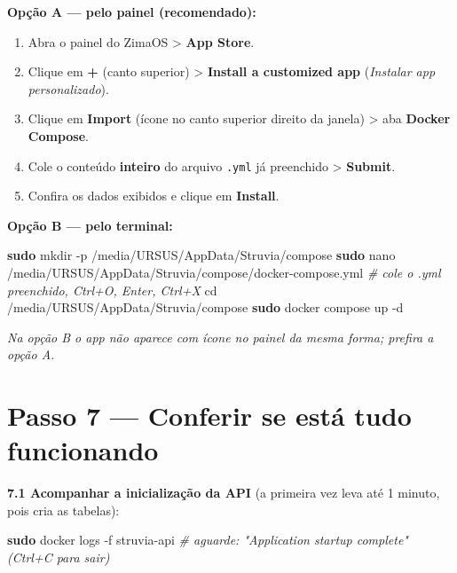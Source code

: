 \documentclass[
  10pt,
]{article}
\newenvironment{Shaded}{\begin{snugshade}}{\end{snugshade}}
\newcommand{\AttributeTok}[1]{\textcolor[rgb]{0.13,0.29,0.53}{#1}}
\newcommand{\BuiltInTok}[1]{#1}
\newcommand{\CommentTok}[1]{\textcolor[rgb]{0.56,0.35,0.01}{\textit{#1}}}
\newcommand{\FunctionTok}[1]{\textcolor[rgb]{0.13,0.29,0.53}{\textbf{#1}}}
\newcommand{\NormalTok}[1]{#1}
\providecommand{\tightlist}{%
  \setlength{\itemsep}{0pt}\setlength{\parskip}{0pt}}
\renewenvironment{quote}{\begin{oldquote}\small\itshape}{\end{oldquote}}
\begin{document}
\textbf{Opção A --- pelo painel (recomendado):}

\begin{enumerate}
\def\labelenumi{\arabic{enumi}.}
\tightlist
\item
  Abra o painel do ZimaOS \textgreater{} \textbf{App Store}.
\item
  Clique em \textbf{+} (canto superior) \textgreater{} \textbf{Install a
  customized app} (\emph{Instalar app personalizado}).
\item
  Clique em \textbf{Import} (ícone no canto superior direito da janela)
  \textgreater{} aba \textbf{Docker Compose}.
\item
  Cole o conteúdo \textbf{inteiro} do arquivo \texttt{.yml} já
  preenchido \textgreater{} \textbf{Submit}.
\item
  Confira os dados exibidos e clique em \textbf{Install}.
\end{enumerate}

\textbf{Opção B --- pelo terminal:}

\begin{Shaded}
\begin{Highlighting}[]
\FunctionTok{sudo}\NormalTok{ mkdir }\AttributeTok{{-}p}\NormalTok{ /media/URSUS/AppData/Struvia/compose}
\FunctionTok{sudo}\NormalTok{ nano /media/URSUS/AppData/Struvia/compose/docker{-}compose.yml   }\CommentTok{\# cole o .yml preenchido, Ctrl+O, Enter, Ctrl+X}
\BuiltInTok{cd}\NormalTok{ /media/URSUS/AppData/Struvia/compose}
\FunctionTok{sudo}\NormalTok{ docker compose up }\AttributeTok{{-}d}
\end{Highlighting}
\end{Shaded}

\begin{quote}
Na opção B o app não aparece com ícone no painel da mesma forma; prefira
a opção A.
\end{quote}

\hypertarget{passo-7-conferir-se-estuxe1-tudo-funcionando}{%
\section{Passo 7 --- Conferir se está tudo
funcionando}\label{passo-7-conferir-se-estuxe1-tudo-funcionando}}

\textbf{7.1 Acompanhar a inicialização da API} (a primeira vez leva até
1 minuto, pois cria as tabelas):

\begin{Shaded}
\begin{Highlighting}[]
\FunctionTok{sudo}\NormalTok{ docker logs }\AttributeTok{{-}f}\NormalTok{ struvia{-}api}
\CommentTok{\# aguarde: "Application startup complete" (Ctrl+C para sair)}
\end{Highlighting}
\end{Shaded}
\end{document}
